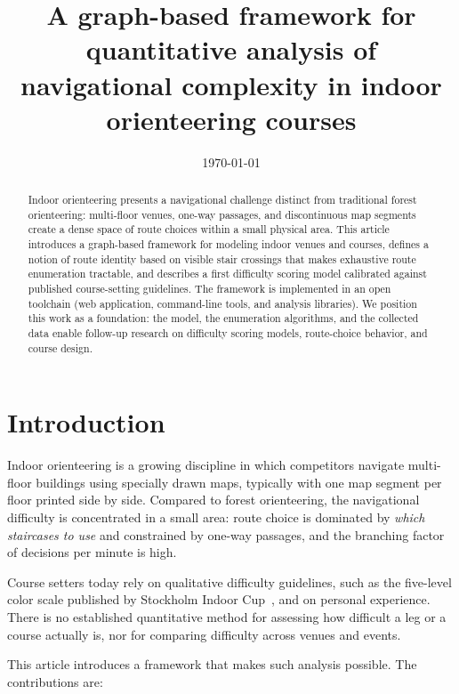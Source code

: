 \documentclass[11pt,a4paper,twocolumn]{article}
\title{A graph-based framework for quantitative analysis of navigational complexity in indoor orienteering courses}
\author{}
\date{\today}
\begin{document}
\maketitle

\begin{abstract}
Indoor orienteering presents a navigational challenge distinct from
traditional forest orienteering: multi-floor venues, one-way passages, and
discontinuous map segments create a dense space of route choices within a
small physical area. This article introduces a graph-based framework for
modeling indoor venues and courses, defines a notion of route identity
based on visible stair crossings that makes exhaustive route enumeration
tractable, and describes a first difficulty scoring model calibrated
against published course-setting guidelines. The framework is implemented in
an open toolchain (web application, command-line tools, and analysis
libraries). We position this work as a foundation: the model, the enumeration
algorithms, and the collected data enable follow-up
research on difficulty scoring models, route-choice behavior, and course design.
\end{abstract}

\section{Introduction}

Indoor orienteering is a growing discipline in which competitors navigate
multi-floor buildings using specially drawn maps, typically with one map
segment per floor printed side by side. Compared to forest orienteering, the
navigational difficulty is concentrated in a small area: route choice is
dominated by \emph{which staircases to use} and constrained by one-way
passages, and the branching factor of decisions per minute is high.

Course setters today rely on qualitative difficulty guidelines, such as the
five-level color scale published by Stockholm Indoor
Cup~\cite{sic-difficulty}, and on personal experience. There is no established
quantitative method for assessing how difficult a leg or a course actually is,
nor for comparing difficulty across venues and events.

This article introduces a framework that makes such analysis possible. The
contributions are:
\end{document}

